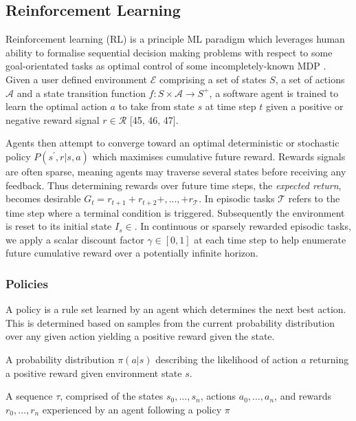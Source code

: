 \documentclass[runningheads]{llncs}
\begin{document}
\subsection{Reinforcement Learning}

Reinforcement learning (RL) is a principle ML paradigm which leverages human ability to formalise sequential decision making problems with respect to some goal-orientated tasks as optimal control of some incompletely-known MDP \cite{sutton2018reinforcement}. Given a user defined environment $\mathcal{E}$ comprising a set of states $S$, a set of actions $\mathcal{A}$ and a state transition function $f: S \times \mathcal{A} \to S^+$, a software agent is trained to learn the optimal action $a$ to take from state $s$ at time step $t$ given a positive or negative reward signal $r \in \mathcal{R}$ [45, 46, 47]. 

Agents then attempt to converge toward an optimal deterministic or stochastic policy $P(s^{\prime},r|s,a)$ which maximises cumulative future reward. Rewards signals are often sparse, meaning agents may traverse several states before receiving any feedback. Thus determining rewards over future time steps, the \textit{expected return}, becomes desirable \begin{math}
	G_t = r_{t+1} + r_{t+2} +,...,+ r_{\mathcal{T}}
\end{math}. In episodic tasks $\mathcal{T}$ refers to the time step where a terminal condition is triggered. Subsequently the environment is reset to its initial state $I_s \in $. In continuous or sparsely rewarded episodic tasks, we apply a scalar discount factor $\gamma \in [0,1]$ at each time step to help enumerate future cumulative reward over a potentially infinite horizon.


\subsubsection{Policies}
A policy is a rule set learned by an agent which determines the next best action. This is determined based on samples from the current probability distribution over any given action yielding a positive reward given the state.

\begin{definition}[Policy]A probability distribution $\pi(a|s)$ describing the likelihood of action $a$ returning a positive reward given environment state $s$.
\end{definition}

\begin{definition}[Trajectory]
	A sequence $\tau$, comprised of the states $s_0,...,s_n$, actions
	$a_0,...,a_n$, and rewards $r_0,...,r_n$ experienced by an agent following a policy $\pi$
\end{definition}
\end{document}
